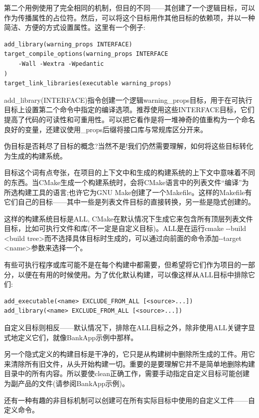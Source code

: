 第二个用例使用了完全相同的机制，但目的不同——其创建了一个逻辑目标，可以作为传播属性的占位符。然后，可以将这个目标用作其他目标的依赖项，并以一种简洁、方便的方式设置属性。这里有一个例子:

\begin{lstlisting}[style=styleCMake]
add_library(warning_props INTERFACE)
target_compile_options(warning_props INTERFACE
	-Wall -Wextra -Wpedantic
)
target_link_libraries(executable warning_props)
\end{lstlisting}

add\_library(INTERFACE)指令创建一个逻辑warning\_props目标，用于在可执行目标上设置第二个命令中指定的编译选项。推荐使用这些INTERFACE目标，它们提高了代码的可读性和可重用性。可以把它看作是将一堆神奇的值重构为一个命名良好的变量，还建议使用\_props后缀将接口库与常规库区分开来。

伪目标是否耗尽了目标的概念?当然不是!我们仍然需要理解，如何将这些目标转化为生成的构建系统。


目标这个词有点夸张，在项目的上下文中和生成的构建系统的上下文中意味着不同的东西。当CMake生成一个构建系统时，会将CMake语言中的列表文件“编译”为所选构建工具的语言;也许它为GNU Make创建了一个Makefile。这样的Makefile有它们自己的目标——其中一些是列表文件目标的直接转换，另一些是隐式创建的。

这样的构建系统目标是ALL, CMake在默认情况下生成它来包含所有顶层列表文件目标，比如可执行文件和库(不一定是自定义目标)。ALL是在运行cmake -{}-build <build tree>而不选择具体目标时生成的，可以通过向前面的命令添加-{}-target <name>参数来选择一个。

有些可执行程序或库可能不是在每个构建中都需要，但希望将它们作为项目的一部分，以便在有用的时候使用。为了优化默认构建，可以像这样从ALL目标中排除它们:

\begin{lstlisting}[style=styleCMake]
add_executable(<name> EXCLUDE_FROM_ALL [<source>...])
add_library(<name> EXCLUDE_FROM_ALL [<source>...])
\end{lstlisting}

自定义目标则相反——默认情况下，排除在ALL目标之外，除非使用ALL关键字显式地定义它们，就像BankApp示例中那样。

另一个隐式定义的构建目标是干净的，它只是从构建树中删除所生成的工件。用它来清除所有旧文件，从头开始构建一切。重要的是要理解它并不是简单地删除构建目录中的所有内容。所以要使clean正确工作，需要手动指定自定义目标可能创建为副产品的文件(请参阅BankApp示例)。

还有一种有趣的非目标机制可以创建可在所有实际目标中使用的自定义工件——自定义命令。

